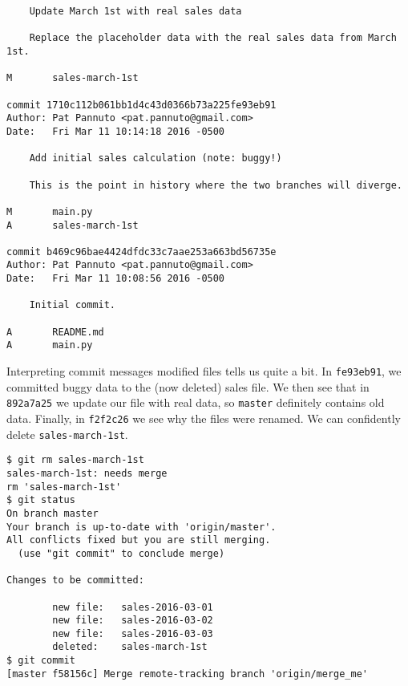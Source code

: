 \documentclass{article}
\begin{document}
{\begin{verbatim}
    Update March 1st with real sales data

    Replace the placeholder data with the real sales data from March 1st.

M       sales-march-1st

commit 1710c112b061bb1d4c43d0366b73a225fe93eb91
Author: Pat Pannuto <pat.pannuto@gmail.com>
Date:   Fri Mar 11 10:14:18 2016 -0500

    Add initial sales calculation (note: buggy!)

    This is the point in history where the two branches will diverge.

M       main.py
A       sales-march-1st

commit b469c96bae4424dfdc33c7aae253a663bd56735e
Author: Pat Pannuto <pat.pannuto@gmail.com>
Date:   Fri Mar 11 10:08:56 2016 -0500

    Initial commit.

A       README.md
A       main.py
    \end{verbatim}

    Interpreting commit messages modified files tells us quite a bit.  In
    \texttt{fe93eb91}, we committed buggy data to the (now deleted) sales file.
    We then see that in \texttt{892a7a25} we update our file with real data, so
    \texttt{master} definitely contains old data. Finally, in \texttt{f2f2c26}
    we see why the files were renamed. We can confidently delete
    \texttt{sales-march-1st}.

    \begin{verbatim}
$ git rm sales-march-1st
sales-march-1st: needs merge
rm 'sales-march-1st'
$ git status
On branch master
Your branch is up-to-date with 'origin/master'.
All conflicts fixed but you are still merging.
  (use "git commit" to conclude merge)

Changes to be committed:

        new file:   sales-2016-03-01
        new file:   sales-2016-03-02
        new file:   sales-2016-03-03
        deleted:    sales-march-1st
$ git commit
[master f58156c] Merge remote-tracking branch 'origin/merge_me'
    \end{verbatim}
}
\end{document}
